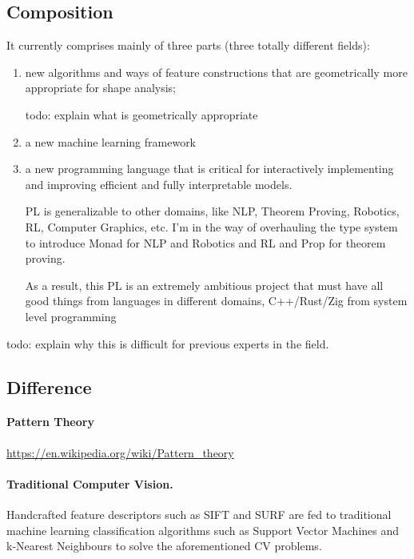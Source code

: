 \documentclass[11pt, oneside]{article}   	%
\theoremstyle{definition}
\begin{document}
\subsection{Composition}

It currently comprises mainly of three parts (three totally different fields):
\begin{enumerate}[(1)]
	\item new algorithms and ways of feature constructions that are geometrically more appropriate for shape analysis;

	\begin{rmk}
	todo: explain what is geometrically appropriate
	\end{rmk}
	\item a new machine learning framework

	\item a new programming language that is critical for interactively implementing and improving efficient and fully interpretable models.

	\begin{rmk}
		PL is generalizable to other domains, like NLP, Theorem Proving, Robotics, RL, Computer Graphics, etc. I'm in the way of overhauling the type system to introduce Monad for NLP and Robotics and RL and Prop for theorem proving.

		As a result, this PL is an extremely ambitious project that must have all good things from languages in different domains, C++/Rust/Zig from system level programming
	\end{rmk}
\end{enumerate}

\begin{rmk}
	todo: explain why this is difficult for previous experts in the field.
\end{rmk}

\subsection{Difference}

\paragraph{Pattern Theory}
\url{https://en.wikipedia.org/wiki/Pattern_theory}

\paragraph{Traditional Computer Vision.} 
Handcrafted feature descriptors such as SIFT and SURF are fed to traditional
machine learning classification algorithms such as Support Vector Machines and k-Nearest Neighbours to solve the aforementioned CV problems.
\end{document}
